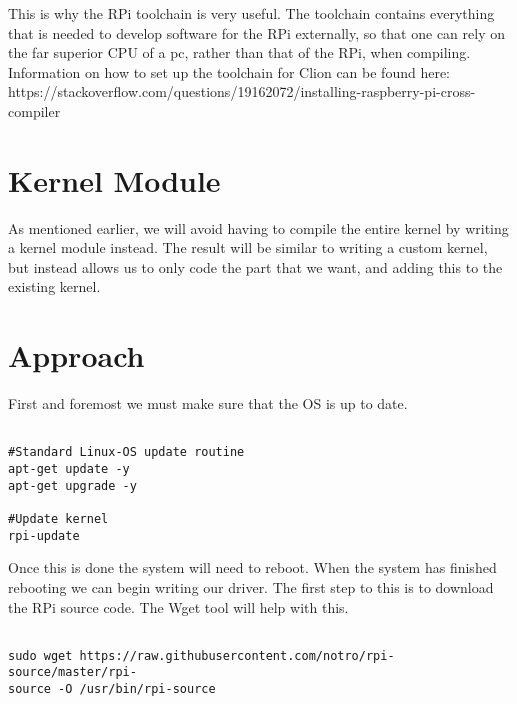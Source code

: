 \documentclass[
10pt, %
a4paper, %
oneside, %
headinclude,footinclude, %
BCOR5mm, %
]{scrartcl}
\begin{document}
This is why the RPi toolchain is very useful. The toolchain contains everything that is needed to develop software for the RPi externally, so that one can rely on the far superior CPU of a pc, rather than that of the RPi, when compiling. Information on how to set up the toolchain for Clion can be found here:
 https://stackoverflow.com/questions/19162072/installing-raspberry-pi-cross-compiler
  

\section{Kernel Module}

As mentioned earlier, we will avoid having to compile the entire kernel by writing a kernel module instead. The result will be similar to writing a custom kernel, but instead allows us to only code the part that we want, and adding this to the existing kernel.


\section{Approach}

First and foremost we must make sure that the OS is up to date.


\begin{lstlisting}

#Standard Linux-OS update routine
apt-get update -y
apt-get upgrade -y

#Update kernel
rpi-update

\end{lstlisting}

Once this is done the system will need to reboot. When the system has finished rebooting we can begin writing our driver. The first step to this is to download the RPi source code. The Wget tool will help with this.

\begin{lstlisting}

sudo wget https://raw.githubusercontent.com/notro/rpi-source/master/rpi-
source -O /usr/bin/rpi-source

\end{lstlisting}
\end{document}
